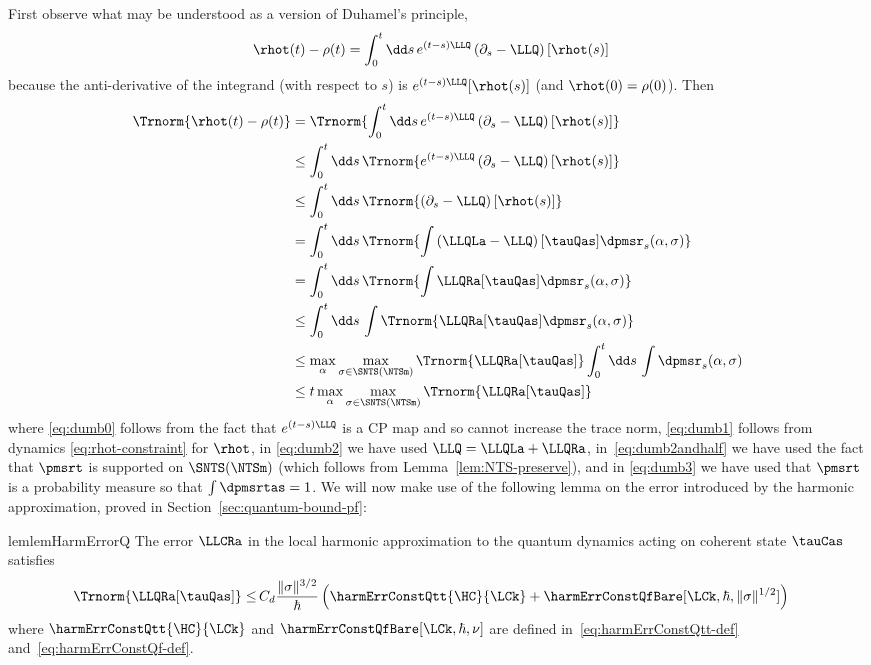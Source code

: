 \documentclass{article}
\numberwithin{equation}{section}
\begin{document}
First observe what may be understood as a version of Duhamel's principle,
\begin{align}\label{eq:duhamel-quantum}
	\rhot(t)-\rho(t)	& = \int_0^t \dd s \,  e^{ (t-s) \LLQ} \left( \partial_s - \LLQ \right) [\rhot(s)]
\end{align}
because the anti-derivative of the integrand (with respect to $s$) is $e^{ (t-s) \LLQ}  [\rhot(s)]$ (and $\rhot(0)=\rho(0)$). Then 
\begin{align}
	\Trnorm{\rhot(t)-\rho(t)}
	& = \Trnorm{  \int_0^t \dd s \,  e^{ (t-s) \LLQ} \left( \partial_s - \LLQ \right) [\rhot(s)] } \\
	& \le  \int_0^t \dd s \,   \Trnorm{ e^{ (t-s) \LLQ} \left( \partial_s - \LLQ \right) [\rhot(s)] } \\
	\label{eq:dumb0}
	& \le  \int_0^t \dd s \,   \Trnorm{ \left( \partial_s - \LLQ \right) [\rhot(s)] } \\
	\label{eq:dumb1}
	& =  \int_0^t \dd s \,   \Trnorm{ \int \left(  \LLQLa - \LLQ \right)    [\tauQas] \dpmsr_s(\alpha,\sigma)} \\
	\label{eq:dumb2}
	& =  \int_0^t \dd s \,   \Trnorm{ \int  \LLQRa   [\tauQas] \dpmsr_s(\alpha,\sigma)} \\
	&\le \int_0^t \dd s \, \int \Trnorm{ \LLQRa [\tauQas] \dpmsr_s(\alpha,\sigma) }\\
	&
 \label{eq:dumb2andhalf}
 \le \max_\alpha \max_{\sigma\in\SNTS(\NTSm)} \Trnorm{ \LLQRa [\tauQas]} \int_0^t \dd s \, \int \dpmsr_s(\alpha,\sigma) \\
	\label{eq:dumb3}
	&\le t \max_\alpha \max_{\sigma\in\SNTS(\NTSm)} \Trnorm{ \LLQRa [\tauQas]}
\end{align}
where \eqref{eq:dumb0} follows from the fact that $e^{ (t-s) \LLQ}$ is a CP map and so cannot increase the trace norm,
\eqref{eq:dumb1} follows from dynamics \eqref{eq:rhot-constraint} for $\rhot$, in \eqref{eq:dumb2} we have used $\LLQ = \LLQLa+\LLQRa$, in~\eqref{eq:dumb2andhalf} we have used the fact that $\pmsrt$ is supported on $\SNTS(\NTSm)$ (which follows from Lemma~\ref{lem:NTS-preserve}), and in
\eqref{eq:dumb3} we have used that $\pmsrt$ is a probability measure so that $\int \dpmsrtas = 1$. We will now make use of the following lemma on the error introduced by the harmonic approximation, proved in Section~\ref{sec:quantum-bound-pf}:
\begin{restatable}{lem}{lemHarmErrorQ}
	\label{lem:HarmErrorQ}
	The error $\LLCRa$ in the local harmonic approximation to the quantum dynamics acting on coherent state $\tauCas$ satisfies
	\begin{align}
     \label{eq:main-trace-err}
		\Trnorm{ \LLQRa[\tauQas] }  \leq 
        &\, C_d\frac{\|\sigma\|^{3/2}}{\hbar} 
        \left(\harmErrConstQtt{\HC}{\LCk} + \harmErrConstQfBare[\LCk,\hbar,\|\sigma\|^{1/2}] \right)
	\end{align}
 where $\harmErrConstQtt{\HC}{\LCk}$ and 
 $\harmErrConstQfBare[\LCk,\hbar,\nu]$ are defined in~\eqref{eq:harmErrConstQtt-def} and~\eqref{eq:harmErrConstQf-def}.
\end{restatable}
\end{document}
